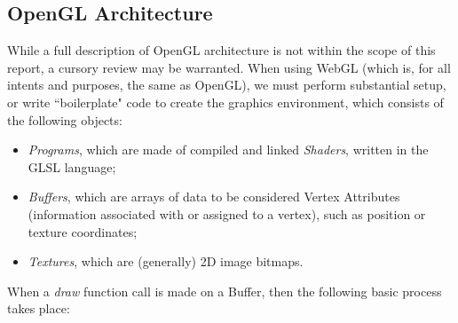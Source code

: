 \subsection{OpenGL Architecture}
While a full description of OpenGL architecture is not within the scope of this report, a cursory review may be warranted. When using WebGL (which is, for all intents and purposes, the same as OpenGL), we must perform substantial setup, or write ``boilerplate" code to create the graphics environment, which consists of the following objects:\cite{opengles2}
\begin{itemize}
    \item \emph{Programs}, which are made of compiled and linked \emph{Shaders}, written in the GLSL language;
    \item \emph{Buffers}, which are arrays of data to be considered Vertex Attributes (information associated with or assigned to a vertex), such as position or texture coordinates;
    \item \emph{Textures}, which are (generally) 2D image bitmaps.
\end{itemize}
\par When a \emph{draw} function call is made on a Buffer, then the following basic process takes place:

